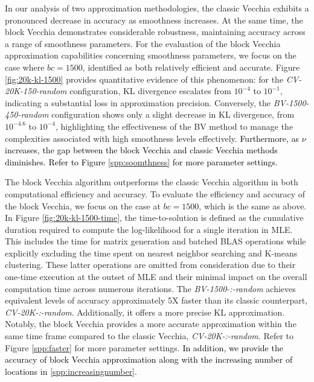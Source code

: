 \documentclass[12pt]{article}
\begin{document}
    In our analysis of two approximation methodologies, the classic Vecchia exhibits a pronounced decrease in accuracy as smoothness increases. At the same time, the block Vecchia demonstrates considerable robustness, maintaining accuracy across a range of smoothness parameters.
    For the evaluation of the block Vecchia approximation capabilities concerning smoothness parameters, we focus on the case where $bc=1500$, identified as both relatively efficient and accurate. 
    Figure \ref{fig:20k-kl-1500} provides quantitative evidence of this phenomenon: for the \textit{CV-20K-150-random} configuration, KL divergence escalates from $10^{-4}$ to $10^{-1}$, indicating a substantial loss in approximation precision. Conversely, the \textit{BV-1500-450-random} configuration shows only a slight decrease in KL divergence, from $10^{-4.6}$ to $10^{-4}$, highlighting the effectiveness of the BV method to manage the complexities associated with high smoothness levels effectively. \textcolor{black}{Furthermore, as $\nu$ increases, the gap between the block Vecchia and classic Vecchia methods diminishes. Refer to Figure \ref{spp:soomthness} for more parameter settings.}

The block Vecchia algorithm outperforms the classic Vecchia algorithm in both computational efficiency and accuracy. To evaluate the efficiency and accuracy of the block Vecchia, we focus on the case at $bc=1500$, which is the same as above.
    In Figure \ref{fig:20k-kl-1500-time}, the time-to-solution is defined as the cumulative duration required to compute the log-likelihood for a single iteration in MLE. This includes the time for matrix generation and batched BLAS operations while explicitly excluding the time spent on nearest neighbor searching and K-means clustering. These latter operations are omitted from consideration due to their one-time execution at the outset of MLE and their minimal impact on the overall computation time across numerous iterations.
    The \textit{BV-1500-:-random} achieves equivalent levels of accuracy approximately 5X faster than its classic counterpart, \textit{CV-20K-:-random}. Additionally, it offers a more precise KL approximation. Notably, the block Vecchia provides a more accurate approximation within the same time frame compared to the classic Vecchia, \textit{CV-20K-:-random}. Refer to Figure \ref{spp:faster} for more parameter settings. \textcolor{black}{In addition, we provide the accuracy of block Vecchia approximation along with the increasing number of locations in \ref{spp:increasingnumber}.}
\end{document}
